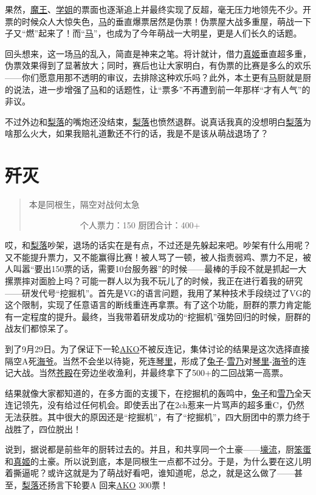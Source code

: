 果然，\uline{魔王}、\uline{学姐}的票面也逐渐追上并最终实现了反超，毫无压力地领先不少。开票的时候众人大惊失色，\uline{马}的垂直爆票居然是伪票！伪票屋大战多重屋，萌战一下子又“燃”起来了！而“\uline{马}”，也成为了今年萌战一大明星，更是人们长久的话题。

回头想来，这一场\uline{马}的乱入，简直是神来之笔。将计就计，借力\uline{真姬}垂直超多重，伪票效果得到了显著放大；同时，赛后也让大家明白，有伪票的比赛是多么的欢乐——你们愿意用那不透明的审议，去排除这种欢乐吗？此外，本土更有\uline{马}厨就是厨的说法，进一步增强了\uline{马}和的话题性，让“票多”不再遭到前一年那样“才有人气”的非议。

不过外边和\uline{梨落}的嘴炮还没结束，\uline{梨落}也愤然退群。说真话我真的没想明白\uline{梨落}为啥那么火大，如果我赔礼道歉还不行的话，我是不是该从萌战退场了？

\chapter{歼灭}
\begin{quote}
本是同根生，隔空对战何太急

　　　　　　个人票力：150 厨团合计：400+
\end{quote}

哎，和\uline{梨落}吵架，退场的话实在是有点，不过还是先躲起来吧。吵架有什么用呢？又不能提升票力，又不能赢得比赛！被人骂了一顿，被人指责弱鸡、票力不足，被人叫嚣“要出150票的话，需要10台服务器”的时候——最棒的手段不就是抓起一大摞票摔对面脸上吗？可能一群人以为我不玩儿了的时候，我正在进行着我的研究——研发代号“挖掘机”。首先是VG的语言问题，我用了某种技术手段绕过了VG的这个限制，实现了任意语言的断线重连再拿票。有了这个功能，厨群的票力肯定能有一定程度的提升。最终，当我带着研发成功的“挖掘机”强势回归的时候，厨群的战友们都惊呆了。

到了9月29日。为了保证下一轮\uline{AKO}不被反连记，集体讨论的结果是这次选择直接隔空A死\uline{海爷}。当然不会坐以待毙，死连\uline{琴里}，形成了\uline{兔子}-\uline{雪乃}对\uline{琴里}-\uline{海爷}的连记大战。当然\uline{苍殿}在旁边坐收渔利，并最终拿下了500+的二回战第一高票。

结果就像大家都知道的，在多方面的支援下，在挖掘机的轰鸣中，\uline{兔子}和\uline{雪乃}全天连记领先，没有给过任何机会。即使丢出了在2ch惹来一片骂声的超多重C，仍然无法获胜。其中很大的原因还是“挖掘机”，有了“挖掘机”，四大厨团中的票力终于战胜了，四位脱出！

说到，据说都是前些年的厨转过去的。并且，和共享同一个土豪——\uline{壕流}，厨\uline{笨蛋}和\uline{真姬}的土豪。所以说到底，本是同根生一点都不过分。于是，为什么要在这儿明着撕逼呢？或许这就是为了萌战好看吧，谁知道呢，总之，就是这么做了——甚至，\uline{梨落}还扬言下轮要A 回来\uline{AKO} 300票！

